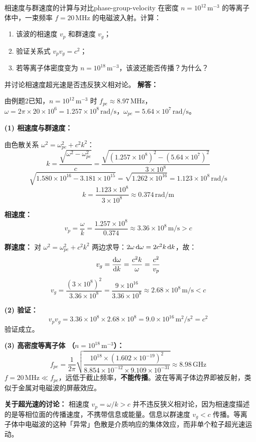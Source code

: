 \begin{example}{相速度与群速度的计算与对比}{phase-group-velocity}
在密度 $n=10^{12}\,\mathrm{m}^{-3}$ 的等离子体中，一束频率 $f=20\,\mathrm{MHz}$ 的电磁波入射。计算：
\begin{enumerate}[label=(\arabic*)]
\item 该波的相速度 $v_p$ 和群速度 $v_g$；
\item 验证关系式 $v_p v_g = c^2$；
\item 若等离子体密度变为 $n=10^{18}\,\mathrm{m}^{-3}$，该波还能否传播？为什么？
\end{enumerate}
并讨论相速度超光速是否违反狭义相对论。
\tcblower
\textbf{解答：}

由例题2已知，$n=10^{12}\,\mathrm{m}^{-3}$ 时 $f_{pe} \approx 8.97\,\mathrm{MHz}$，$\omega = 2\pi\times 20\times 10^6 = 1.257\times 10^8\,\mathrm{rad/s}$，$\omega_{pe} = 5.64\times 10^7\,\mathrm{rad/s}$。

\textbf{(1) 相速度与群速度：}

由色散关系 $\omega^2 = \omega_{pe}^2 + c^2k^2$：
\[
k = \frac{\sqrt{\omega^2 - \omega_{pe}^2}}{c} = \frac{\sqrt{(1.257\times 10^8)^2 - (5.64\times 10^7)^2}}{3\times 10^8}
\]
\[
\sqrt{1.580\times 10^{16} - 3.181\times 10^{15}} = \sqrt{1.262\times 10^{16}} = 1.123\times 10^8\,\mathrm{rad/s}
\]
\[
k = \frac{1.123\times 10^8}{3\times 10^8} \approx 0.374\,\mathrm{rad/m}
\]

\textbf{相速度：}
\[
v_p = \frac{\omega}{k} = \frac{1.257\times 10^8}{0.374} \approx 3.36\times 10^8\,\mathrm{m/s} > c
\]

\textbf{群速度：}
对 $\omega^2 = \omega_{pe}^2 + c^2k^2$ 两边求导：$2\omega\,\mathrm{d}\omega = 2c^2k\,\mathrm{d} k$，故：
\[
v_g = \frac{\mathrm{d}\omega}{\mathrm{d} k} = \frac{c^2k}{\omega} = \frac{c^2}{v_p}
\]
\[
v_g = \frac{(3\times 10^8)^2}{3.36\times 10^8} = \frac{9\times 10^{16}}{3.36\times 10^8} \approx 2.68\times 10^8\,\mathrm{m/s} < c
\]

\textbf{(2) 验证：}
\[
v_p v_g = 3.36\times 10^8\times 2.68\times 10^8 = 9.0\times 10^{16}\,\mathrm{m^2/s^2} = c^2
\]
验证成立。

\textbf{(3) 高密度等离子体 （$n=10^{18}\,\mathrm{m}^{-3}$）：}
\[
f_{pe} = \frac{1}{2\pi}\sqrt{\frac{10^{18}\times (1.602\times 10^{-19})^2}{8.854\times 10^{-12}\times 9.109\times 10^{-31}}} \approx 8.98\,\mathrm{GHz}
\]
$f = 20\,\mathrm{MHz} \ll f_{pe}$，远低于截止频率，\textbf{不能传播}。波在等离子体边界即被反射，类似于金属对电磁波的屏蔽效应。

\textbf{关于超光速的讨论：}
相速度 $v_p = \omega/k > c$ 并不违反狭义相对论，因为相速度描述的是等相位面的传播速度，不携带信息或能量。信息以群速度 $v_g < c$ 传播。等离子体中电磁波的这种「异常」色散是介质响应的集体效应，而非单个粒子超光速运动。
\end{example}

